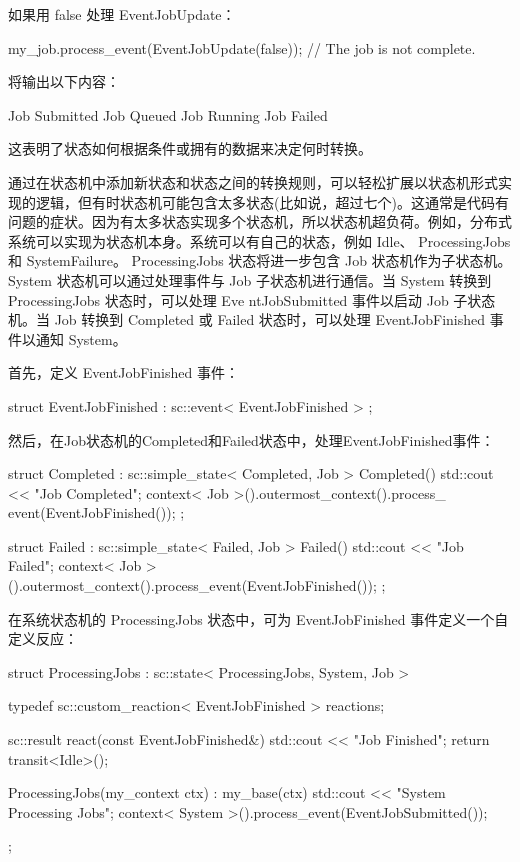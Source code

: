 如果用 false 处理 EventJobUpdate：

\begin{cpp}
my_job.process_event(EventJobUpdate(false)); // The job is not complete.
\end{cpp}

将输出以下内容：

\begin{shell}
Job Submitted
Job Queued
Job Running
Job Failed
\end{shell}

这表明了状态如何根据条件或拥有的数据来决定何时转换。

通过在状态机中添加新状态和状态之间的转换规则，可以轻松扩展以状态机形式实现的逻辑，但有时状态机可能包含太多状态(比如说，超过七个)。这通常是代码有问题的症状。因为有太多状态实现多个状态机，所以状态机超负荷。例如，分布式系统可以实现为状态机本身。系统可以有自己的状态，例如 Idle、 ProcessingJobs 和 SystemFailure。 ProcessingJobs 状态将进一步包含 Job 状态机作为子状态机。 System 状态机可以通过处理事件与 Job 子状态机进行通信。当 System 转换到 ProcessingJobs 状态时，可以处理 Eve ntJobSubmitted 事件以启动 Job 子状态机。当 Job 转换到 Completed 或 Failed 状态时，可以处理 EventJobFinished 事件以通知 System。

首先，定义 EventJobFinished 事件：

\begin{cpp}
struct EventJobFinished : sc::event< EventJobFinished > {};
\end{cpp}

然后，在Job状态机的Completed和Failed状态中，处理EventJobFinished事件：

\begin{cpp}
struct Completed : sc::simple_state< Completed, Job > {
    Completed() {
        std::cout << "Job Completed\n";
        context< Job >().outermost_context().process_
        event(EventJobFinished());
    }
};

struct Failed : sc::simple_state< Failed, Job > {
    Failed() {
        std::cout << "Job Failed\n";
        context< Job >().outermost_context().process_event(EventJobFinished());
    }
};
\end{cpp}

在系统状态机的 ProcessingJobs 状态中，可为 EventJobFinished 事件定义一个自定义反应：

\begin{cpp}
struct ProcessingJobs : sc::state< ProcessingJobs, System, Job > {
    typedef sc::custom_reaction< EventJobFinished > reactions;

    sc::result react(const EventJobFinished&) {
        std::cout << "Job Finished\n";
        return transit<Idle>();
    }

    ProcessingJobs(my_context ctx) : my_base(ctx) {
        std::cout << "System Processing Jobs\n";
        context< System >().process_event(EventJobSubmitted());
    }
};
\end{cpp}

